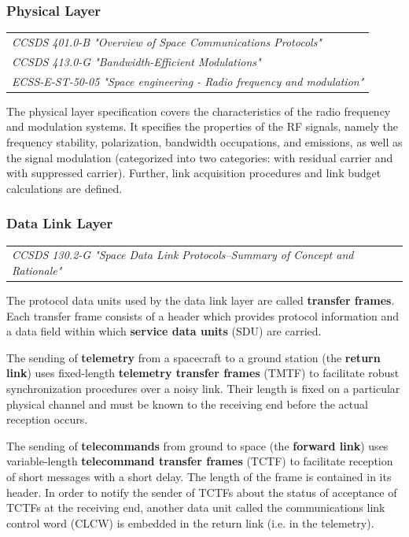 \subsubsection{Physical Layer}

\begin{tabular}{l}
\textit{CCSDS 401.0-B "Overview of Space Communications Protocols" \cite{CCSDS 401.0-B}} \\
\textit{CCSDS 413.0-G "Bandwidth-Efficient Modulations" \cite{CCSDS 413.0-G}} \\
\textit{ECSS-E-ST-50-05 "Space engineering - Radio frequency and modulation" \cite{ECSS-E-ST-50-05}}
\end{tabular}

The physical layer specification covers the characteristics of the radio frequency and modulation systems. It specifies the properties of the RF signals, namely the frequency stability, polarization, bandwidth occupations, and emissions, as well as the signal modulation (categorized into two categories: with residual carrier and with suppressed carrier). Further, link acquisition procedures and link budget calculations are defined.

\subsubsection{Data Link Layer}

\begin{tabular}{l}
\textit{CCSDS 130.2-G "Space Data Link Protocols--Summary of Concept and Rationale" \cite{CCSDS 130.2-G}}
\end{tabular}

The protocol data units used by the data link layer are called \textbf{transfer frames}. Each transfer frame consists of a header which provides protocol information and a data field within which \textbf{service data units} (SDU) are carried.

The sending of \textbf{telemetry} from a spacecraft to a ground station (the \textbf{return link}) uses fixed-length \textbf{telemetry transfer frames} (TMTF) to facilitate robust synchronization procedures over a noisy link. Their length is fixed on a particular physical channel and must be known to the receiving end before the actual reception occurs.

The sending of \textbf{telecommands} from ground to space (the \textbf{forward link}) uses variable-length \textbf{telecommand transfer frames} (TCTF) to facilitate reception of short messages with a short delay. The length of the frame is contained in its header. In order to notify the sender of TCTFs about the status of acceptance of TCTFs at the receiving end, another data unit called the communications link control word (CLCW) is embedded in the return link (i.e. in the telemetry). 

